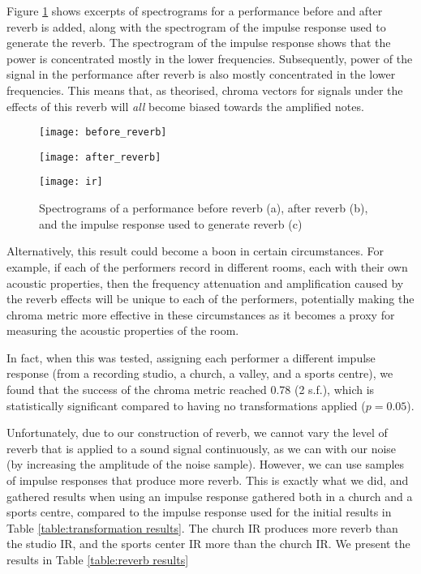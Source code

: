 \documentclass[oneside, class=book, 12pt, crop=false]{standalone}
\begin{document}
Figure \ref{fig:convolutionspectrograms} shows excerpts of spectrograms for a performance before and after reverb is added, along with the spectrogram of the impulse response used to generate the reverb. The spectrogram of the impulse response shows that the power is concentrated mostly in the lower frequencies. Subsequently, power of the signal in the performance after reverb is also mostly concentrated in the lower frequencies. This means that, as theorised, chroma vectors for signals under the effects of this reverb will \textit{all} become biased towards the amplified notes.




\begin{figure}[h]
  \captionsetup{justification=centering}
\begin{minipage}{.33\textwidth}
  \texttt{[image: before\_reverb]}
  \subcaption{}
\end{minipage}%
\begin{minipage}{.33\textwidth}
  \flushleft
  \texttt{[image: after\_reverb]}
  \subcaption{}
\end{minipage}%
\begin{minipage}{.33\textwidth}
  \centering
  \texttt{[image: ir]}
  \subcaption{}
\end{minipage}
\caption{Spectrograms of a performance before reverb (a), after reverb (b), and the impulse response used to generate reverb (c)}
  \label{fig:convolutionspectrograms}
\end{figure}

Alternatively, this result could become a boon in certain circumstances. For example, if each of the performers record in different rooms, each with their own acoustic properties, then the frequency attenuation and amplification caused by the reverb effects will be unique to each of the performers, potentially making the chroma metric more effective in these circumstances as it becomes a proxy for measuring the acoustic properties of the room.

In fact, when this was tested, assigning each performer a different impulse response (from a recording studio, a church, a valley, and a sports centre), we found that the success of the chroma metric reached 0.78 (2 s.f.), which is statistically significant compared to having no transformations applied ($p=0.05$).

Unfortunately, due to our construction of reverb, we cannot vary the level of reverb that is applied to a sound signal continuously, as we can with our noise (by increasing the amplitude of the noise sample). However, we can use samples of impulse responses that produce more reverb. This is exactly what we did, and gathered results when using an impulse response gathered both in a church and a sports centre, compared to the impulse response used for the initial results in Table \ref{table:transformation results}. The church IR produces more reverb than the studio IR, and the sports center IR more than the church IR. We present the results in Table \ref{table:reverb results}
\end{document}

